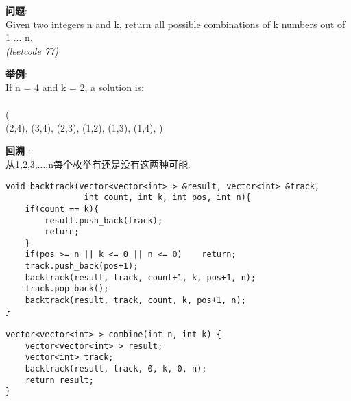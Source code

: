     
\begin{description}
    \item{\textbf{问题}}:\\
Given two integers n and k, return all possible combinations of k numbers out of 1 ... n.\\
\textit{(leetcode 77)}
    \item{\textbf{举例}}:\\
If n = 4 and k = 2, a solution is:\\
\\
(\\
  (2,4),
  (3,4),
  (2,3),
  (1,2),
  (1,3),
  (1,4),
)
    \item{\textbf{回溯}} : 
    \\从1,2,3,...,n每个枚举有还是没有这两种可能.
    \begin{lstlisting}
void backtrack(vector<vector<int> > &result, vector<int> &track,
				int count, int k, int pos, int n){
	if(count == k){
		result.push_back(track);
		return;
	}
	if(pos >= n || k <= 0 || n <= 0)	return;
	track.push_back(pos+1);
	backtrack(result, track, count+1, k, pos+1, n);
	track.pop_back();
	backtrack(result, track, count, k, pos+1, n);
}

vector<vector<int> > combine(int n, int k) {
	vector<vector<int> > result;
	vector<int> track;
	backtrack(result, track, 0, k, 0, n);
	return result;
}
    \end{lstlisting}
\end{description}
